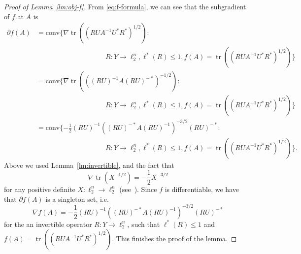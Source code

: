 \documentclass[11pt]{article}
\DeclareMathOperator{\tr}{tr}
\begin{document}
\begin{proof}[Proof of Lemma~\ref{lm:obj-f}]
  From \eqref{eq:f-formula}, we can see that the subgradient of
  $f$ at $A$ is
  \begin{align*}
  \partial f(A) &= \mathrm{conv}
  \{\nabla \tr((RUA^{-1}U^*R^*)^{1/2}):\\
  &\hspace{10em}
  R: Y \to \ell_2^n, \ell^*(R) \le 1,
  f(A) = \tr((RUA^{-1}U^*R^*)^{1/2})\}\\
  &= 
  \mathrm{conv}\{
  \nabla \tr(((RU)^{-1}A(RU)^{-*})^{-1/2}):\\ 
  &\hspace{10em}
  R: Y \to \ell_2^n, \ell^*(R) \le 1, 
  f(A) = \tr((RUA^{-1}U^*R^*)^{1/2})\}\\
  &= 
  \mathrm{conv}\{
  -\frac{1}{2} 
  (RU)^{-1} ((RU)^{-*} A (RU)^{-1})^{-3/2} (RU)^{-*}:\\ 
  &\hspace{10em}
  R: Y \to \ell_2^n, \ell^*(R) \le 1, 
  f(A) = \tr((RUA^{-1}U^*R^*)^{1/2})\}.
  \end{align*}
  Above we used Lemma~\ref{lm:invertible}, and
  the fact that 
  \[
  \nabla \tr(X^{-1/2}) =
  -\frac{1}{2}X^{-3/2}
  \]
  for any positive definite $X:\ell_2^n\to\ell_2^n$ (see~\cite{Lewis95}). Since $f$ is
  differentiable, we have that $\partial f(A)$ is a singleton set,
  i.e.~
  \[
  \nabla f(A) = 
  -\frac{1}{2} (RU)^{-1} ((RU)^{-*} A (RU)^{-1})^{-3/2} (RU)^{-*}
  \]
  for the an invertible operator $R: Y \to \ell_2^n$, such that
  $\ell^*(R) \le 1$ and $f(A) =
  \tr((RUA^{-1}U^*R^*)^{1/2})$. This finishes the proof
  of the lemma.
\end{proof}
\end{document}

